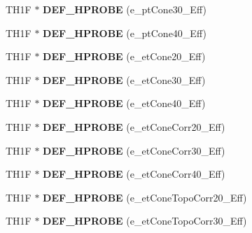 \begin{DoxyCompactItemize}
\item 
\hypertarget{classHistos__Fake_aff709dd09d5406c4cc60a8efb38f1720}{
TH1F $\ast$ {\bfseries DEF\_\-HPROBE} (e\_\-ptCone30\_\-Eff)}
\label{classHistos__Fake_aff709dd09d5406c4cc60a8efb38f1720}

\item 
\hypertarget{classHistos__Fake_a5aa6b8f761c9108cfe71a011f948eb0b}{
TH1F $\ast$ {\bfseries DEF\_\-HPROBE} (e\_\-ptCone40\_\-Eff)}
\label{classHistos__Fake_a5aa6b8f761c9108cfe71a011f948eb0b}

\item 
\hypertarget{classHistos__Fake_a1db760958f6a06ab54a7b01b7acc8aea}{
TH1F $\ast$ {\bfseries DEF\_\-HPROBE} (e\_\-etCone20\_\-Eff)}
\label{classHistos__Fake_a1db760958f6a06ab54a7b01b7acc8aea}

\item 
\hypertarget{classHistos__Fake_a130c965dc125dfcfdd943157073082d0}{
TH1F $\ast$ {\bfseries DEF\_\-HPROBE} (e\_\-etCone30\_\-Eff)}
\label{classHistos__Fake_a130c965dc125dfcfdd943157073082d0}

\item 
\hypertarget{classHistos__Fake_ab07a439c191c7e68ab93da42c5731a96}{
TH1F $\ast$ {\bfseries DEF\_\-HPROBE} (e\_\-etCone40\_\-Eff)}
\label{classHistos__Fake_ab07a439c191c7e68ab93da42c5731a96}

\item 
\hypertarget{classHistos__Fake_aef8242e408069ae661575142696e337a}{
TH1F $\ast$ {\bfseries DEF\_\-HPROBE} (e\_\-etConeCorr20\_\-Eff)}
\label{classHistos__Fake_aef8242e408069ae661575142696e337a}

\item 
\hypertarget{classHistos__Fake_a33de3615cca549347d3d83a8b73746e2}{
TH1F $\ast$ {\bfseries DEF\_\-HPROBE} (e\_\-etConeCorr30\_\-Eff)}
\label{classHistos__Fake_a33de3615cca549347d3d83a8b73746e2}

\item 
\hypertarget{classHistos__Fake_a58e7722280f7a98b67ebd8788b506cfa}{
TH1F $\ast$ {\bfseries DEF\_\-HPROBE} (e\_\-etConeCorr40\_\-Eff)}
\label{classHistos__Fake_a58e7722280f7a98b67ebd8788b506cfa}

\item 
\hypertarget{classHistos__Fake_a4e9523874ee01651327fa2570d83f23d}{
TH1F $\ast$ {\bfseries DEF\_\-HPROBE} (e\_\-etConeTopoCorr20\_\-Eff)}
\label{classHistos__Fake_a4e9523874ee01651327fa2570d83f23d}

\item 
\hypertarget{classHistos__Fake_ae7d8b8a679eb2212986c34e26cf324a4}{
TH1F $\ast$ {\bfseries DEF\_\-HPROBE} (e\_\-etConeTopoCorr30\_\-Eff)}
\label{classHistos__Fake_ae7d8b8a679eb2212986c34e26cf324a4}


\end{DoxyCompactItemize}
